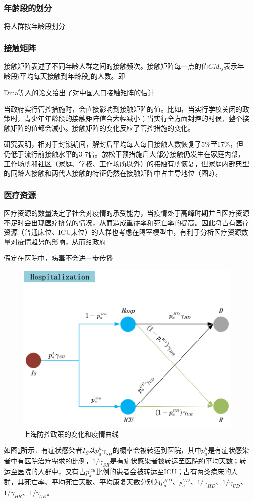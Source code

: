 \documentclass[bwprint]{gmcmthesis}
\numberwithin{figure}{section}
\begin{document}
\subsubsection{年龄段的划分}
将人群按年龄段划分
\subsubsection{接触矩阵}
接触矩阵表述了不同年龄人群之间的接触频次。接触矩阵每一点的值$CM_{ij}$表示年龄段$i$平均每天接触到年龄段$j$的人数。即

Dina等人的论文给出了对中国人口接触矩阵的估计
\par 当政府实行管控措施时，会直接影响到接触矩阵的值。比如，当实行学校关闭的政策时，青少年年龄段的接触矩阵值会大幅减小；当实行全方面封控的时候，整个接触矩阵的值都会减小。接触矩阵的变化反应了管控措施的变化。
\par 研究表明，相对于封锁期间，解封后平均每人每日接触人数恢复了5\%至17\%，但仍低于流行前接触水平的3-7倍。放松干预措施后大部分接触仍发生在家庭内部，工作场所和社区（家庭、学校、工作场所以外）的接触有所恢复，但家庭内部典型的同龄人接触和两代人接触的特征仍然在接触矩阵中占主导地位（图2）。
\subsubsection{医疗资源}
医疗资源的数量决定了社会对疫情的承受能力，当疫情处于高峰时期并且医疗资源不足时会出现医疗挤兑的情况，从而造成重症率和死亡率的提高。因此将占有医疗资源（普通床位、ICU床位）的人群也考虑在隔室模型中，有利于分析医疗资源数量对疫情趋势的影响，从而给政府
\par 假定在医院中，病毒不会进一步传播
\begin{figure}[!h]
\centering
\includegraphics[width=.75\textwidth]{hospital.png}
\caption{上海防控政策的变化和疫情曲线}
\label{hos}
\end{figure}
如图\ref{hos}所示，有症状感染者$I_S$以$p_a^h\gamma_{SH}$的概率会被转运到医院，其中$p_a^h$是有症状感染者中有医院治疗需求的比例，$1/\gamma_{SH}$是有症状感染者被转运至医院的平均天数；转运至医院的人群中，又有占$p_a^{icu}$比例的患者会被转运至ICU；占有两类病床的人群，其死亡率、平均死亡天数、平均康复天数分别为$p_a^{HD}$、$p_a^{UD}$、$1/\gamma_{HD}$、$1/\gamma_{UD}$、$1/\gamma_{HR}$、$1/\gamma_{UR}$。
\end{document}
